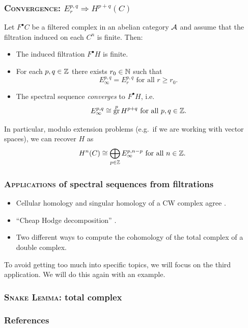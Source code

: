 \documentclass[notheorems, hyperref={backref}]{beamer}
\theoremstyle{plain}
\theoremstyle{definition}
\theoremstyle{darkredexample}
\theoremstyle{remark}
\DeclareMathOperator{\gr}{gr}
\begin{document}
\begin{frame}
    \frametitle{\textsc{Convergence}: $E_{r}^{p,q}\Rightarrow H^{p+q}(C)$ \cite[Theorem 2.6]{mcc01}}
    Let $F^{\bullet}C$ be a filtered complex in an abelian category $\mathcal{A}$ and assume that the filtration induced on each $C^{n}$ is finite.
    Then:
    \pause
    \begin{itemize}
	\item The induced filtration $F^{\bullet}H$ is finite.
	\item For each $p,q\in \mathbb{Z}$ there exists $r_{0}\in \mathbb{N}$ such that
	    \[ E_{\infty}^{p,q}=E_{r}^{p,q} \text{ for all } r\geqslant r_{0}. \]
	\item The spectral sequence \textit{converges} to $F^{\bullet}H$, i.e.
	    \[ E_{\infty}^{p,q}\cong \gr^{p}H^{p+q} \text{ for all }p,q\in\Z. \]
    \end{itemize}
    In particular, modulo extension problems (e.g.~if we are working with vector spaces), we can recover $H$ as
    \[ H^{n}(C)\cong \bigoplus_{p\in \mathbb{Z}}E_{\infty}^{p,n-p}\text{ for all }n\in\mathbb{Z}. \]
\end{frame}

\begin{frame}
    \frametitle{\textsc{Applications} of spectral sequences from filtrations}
    \begin{itemize}
	\item Cellular homology and singular homology of a CW complex agree \cite[Theorem 4.13]{mcc01}.
	    \pause

	\item ``Cheap Hodge decomposition'' \cite[Remark 8.29]{voi02}.
	    \pause

	\item Two different ways to compute the cohomology of the total complex of a double complex.
    \end{itemize}
    \pause

    To avoid getting too much into specific topics, we will focus on the third application.
    We will do this again with an example.
\end{frame}

\begin{frame}
    \frametitle{\textsc{Snake Lemma}: total complex}
\end{frame}

\begin{frame}
    \frametitle{References}
    
    
\end{frame}
 
\end{document}
